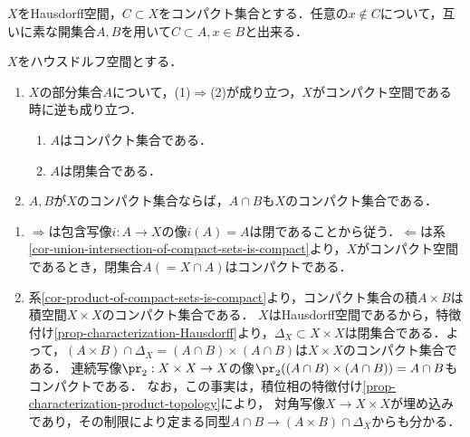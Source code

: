 \documentclass[uplatex,dvipdfmx]{jsreport}
\begin{document}
\begin{lemma}
    $X$をHausdorff空間，$C\subset X$をコンパクト集合とする．任意の$x\notin C$について，互いに素な開集合$A,B$を用いて$C\subset A,x\in B$と出来る．
\end{lemma}

\begin{proposition}[Hausdorff空間内でのコンパクト集合]\label{prop-compact-set-in-Hausdorff-spaces}
    $X$をハウスドルフ空間とする．
    \begin{enumerate}
        \item $X$の部分集合$A$について，(1)$\Rightarrow$(2)が成り立つ，$X$がコンパクト空間である時に逆も成り立つ．
        \begin{enumerate}[(1)]
            \item $A$はコンパクト集合である．
            \item $A$は閉集合である．
        \end{enumerate}
        \item $A,B$が$X$のコンパクト集合ならば，$A\cap B$も$X$のコンパクト集合である．
    \end{enumerate}
\end{proposition}
\begin{Proof}\mbox{}
    \begin{enumerate}
        \item $\Rightarrow$は包含写像$i:A\to X$の像$i(A)=A$は閉であることから従う．$\Leftarrow$は系\ref{cor-union-intersection-of-compact-sets-is-compact}より，$X$がコンパクト空間であるとき，閉集合$A(=X\cap A)$はコンパクトである．
        \item 系\ref{cor-product-of-compact-sets-is-compact}より，コンパクト集合の積$A\times B$は積空間$X\times X$のコンパクト集合である．
        $X$はHausdorff空間であるから，特徴付け\ref{prop-characterization-Hausdorff}より，$\Delta_X\subset X\times X$は閉集合である．よって，$(A\times B)\cap\Delta_X=(A\cap B)\times(A\cap B)$は$X\times X$のコンパクト集合である．
        連続写像$\pr_2:X\times X\to X$の像$\pr_2((A\cap B)\times (A\cap B))=A\cap B$もコンパクトである．
        なお，この事実は，積位相の特徴付け\ref{prop-characterization-product-topology}により，
        対角写像$X\to X\times X$が埋め込みであり，その制限により定まる同型$A\cap B\to(A\times B)\cap\Delta_X$からも分かる．
    \end{enumerate}
\end{Proof}
\end{document}
